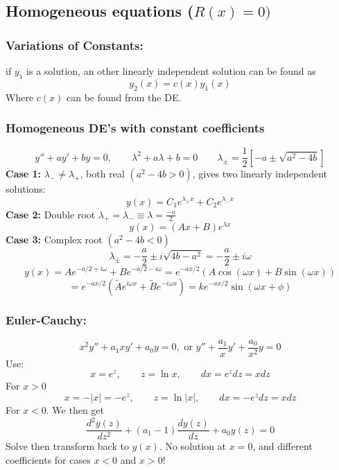 \documentclass[a4paper,norsk, 10pt]{article}
\begin{document}
\subsection{Homogeneous equations ($R(x) = 0)$}
\subsubsection{Variations of Constants:}
if $y_1$ is a solution, an other linearly independent solution can be found as
\begin{equation}
y_2(x) = c(x)y_1(x)
\end{equation}
Where $c(x)$ can be found from the DE.
\subsubsection{Homogeneous DE's with constant coefficients}
\begin{equation}
y'' + ay' + by = 0, \qquad \lambda^2 + a\lambda + b = 0 \qquad \lambda_{\pm} = \frac{1}{2}[-a\pm\sqrt{a^2-4b}]
\end{equation}
\textbf{Case 1:}
$\lambda_- \neq \lambda_+$, both real $(a^2-4b > 0)$, gives two linearly independent solutions:
\begin{equation}
y(x) = C_1e^{\lambda_+ x} + C_2e^{\lambda_- x}
\end{equation}
\textbf{Case 2:}
Double root $\lambda_+ = \lambda_- \equiv \lambda = \frac{-a}{2}$
\begin{equation}
y(x) = (Ax + B)e^{\lambda x}
\end{equation}
\textbf{Case 3:}
Complex root $(a^2-4b < 0)$
\begin{equation}
\lambda_{\pm} = -\frac{a}{2}\pm i \sqrt{4b - a^2} = -\frac{a}{2}\pm i\omega
\end{equation}
\begin{equation}
y(x) = Ae^{-a/2 + i\omega} + Be^{-a/2 - i\omega} = e^{-ax/2}\left(A\cos(\omega x) + B\sin(\omega x)\right)
\end{equation}
\begin{equation}
=e^{-ax/2}\left(\tilde{A}e^{i\omega x} + \tilde{B}e^{-i\omega x}\right) = ke^{-ax/2}\sin(\omega x + \phi)
\end{equation}
\subsubsection{Euler-Cauchy:}
\begin{equation}
x^2y'' + a_1xy' + a_0y=0, \text{  or  } y'' +\frac{a_1}{x}y' + \frac{a_0}{x^2}y = 0
\end{equation}
Use:
\begin{equation}
x = e^z, \qquad z = \ln x, \qquad dx = e^zdz = xdz
\end{equation}
For $x > 0$
\begin{equation}
x = -|x| =  -e^z, \qquad z = \ln |x|, \qquad dx = -e^zdz = xdz
\end{equation}
For $x < 0$. We then get
\begin{equation}
\frac{d^2y(z)}{dz^2} + (a_1 - 1)\frac{dy(z)}{dz}+ a_0y(z) = 0
\end{equation}
Solve then transform back to $y(x)$. No solution at $x = 0$, and different coefficients for cases $x<0$ and $x>0$!
\end{document}
